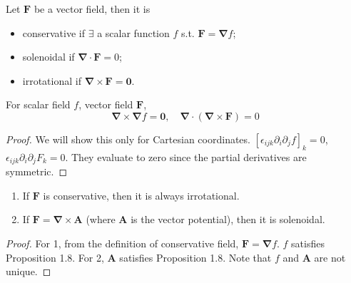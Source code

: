 \documentclass[a4paper]{article}
\begin{document}
\begin{defi}
Let $\mathbf{F}$ be a vector field, then it is
\begin{itemize}
    \item conservative if $\exists$ a scalar function $f$ s.t. $\mathbf{F}=\boldsymbol{\nabla}f$;
    \item solenoidal if $\boldsymbol{\nabla}\cdot\mathbf{F}=0$;
    \item irrotational if $\boldsymbol{\nabla}\times\mathbf{F}=\boldsymbol{0}$.
\end{itemize}
\end{defi}
\begin{prop}
For scalar field $f$, vector field $\mathbf{F}$,
\begin{equation}
    \boldsymbol{\nabla}\times\boldsymbol{\nabla}f=\boldsymbol{0},\quad\boldsymbol{\nabla}\cdot(\boldsymbol{\nabla}\times\mathbf{F})=0\tag{1.11}
\end{equation}
\end{prop}
\begin{proof}
We will show this only for Cartesian coordinates. $[\epsilon_{ijk}\partial_i\partial_jf]_k=0$, $\epsilon_{ijk}\partial_i\partial_jF_k=0$. They evaluate to zero since the partial derivatives are symmetric.
\end{proof}
\begin{thm}\leavevmode
\begin{enumerate}
    \item If $\mathbf{F}$ is conservative, then it is always irrotational.
    \item If $\mathbf{F}=\boldsymbol{\nabla}\times\mathbf{A}$ (where $\mathbf{A}$ is the vector potential), then it is solenoidal.
\end{enumerate}
\end{thm}
\begin{proof}For 1, from the definition of conservative field, $\mathbf{F}=\boldsymbol{\nabla}f$. $f$ satisfies Proposition 1.8. For 2, $\mathbf{A}$ satisfies Proposition 1.8. Note that $f$ and $\mathbf{A}$ are not unique.
\end{proof}
\end{document}
